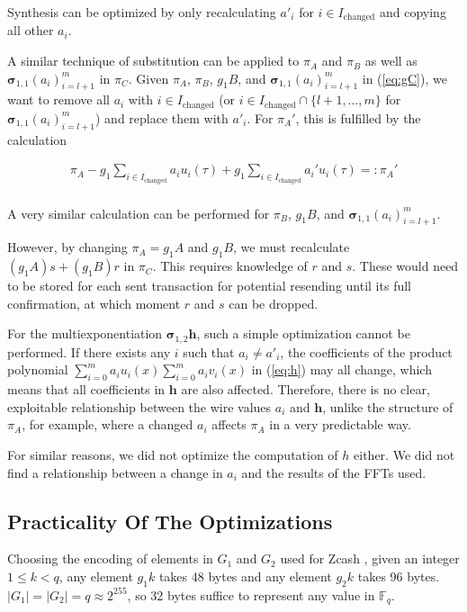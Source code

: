 \documentclass{article}
\begin{document}
Synthesis can be optimized by only recalculating $a'_i$ for $i \in I_\text{changed}$ and copying all other $a_i$.

A similar technique of substitution can be applied to $\pi_A$ and $\pi_B$ as well as $\boldsymbol\sigma_{1,1}(a_i)_{i=l+1}^m$ in $\pi_C$.
Given $\pi_A$, $\pi_B$, $g_1B$, and $\boldsymbol\sigma_{1,1}(a_i)_{i=l+1}^m$ in (\ref{eq:gC}), we want to remove all $a_i$ with $i \in I_\text{changed}$ (or $i \in I_\text{changed} \cap \{l+1,\ldots,m\}$ for $\boldsymbol\sigma_{1,1}(a_i)_{i=l+1}^m$) and replace them with $a'_i$.
For $\pi_A'$, this is fulfilled by the calculation

\begin{align*}
        \pi_A - g_1{\sum_{i \in I_\text{changed}}a_iu_i(\tau)} + g_1{\sum_{i \in I_\text{changed}}a_i'u_i(\tau)} =: \pi_A' \\
\end{align*}

A very similar calculation can be performed for $\pi_B$, $g_1B$, and $\boldsymbol\sigma_{1,1}(a_i)_{i=l+1}^m$.

However, by changing $\pi_A = g_1A$ and $g_1B$, we must recalculate ${(g_1A)}s + {(g_1B)}r$ in $\pi_C$.
This requires knowledge of $r$ and $s$.
These would need to be stored for each sent transaction for potential resending until its full confirmation, at which moment $r$ and $s$ can be dropped.

For the multiexponentiation $\boldsymbol\sigma_{1,2}\boldsymbol{h}$, such a simple optimization cannot be performed.
If there exists any $i$ such that $a_i \neq a'_i$, the coefficients of the product polynomial $\sum_{i=0}^ma_iu_i(x)\sum_{i=0}^ma_iv_i(x)$ in (\ref{eq:h}) may all change, which means that all coefficients in $\boldsymbol{h}$ are also affected.
Therefore, there is no clear, exploitable relationship between the wire values $a_i$ and $\boldsymbol{h}$, unlike the structure of $\pi_A$, for example, where a changed $a_i$ affects $\pi_A$ in a very predictable way.

For similar reasons, we did not optimize the computation of $h$ either.
We did not find a relationship between a change in $a_i$ and the results of the FFTs used.

\subsection{Practicality Of The Optimizations} \label{sec:benchmarks}

Choosing the encoding of elements in $G_1$ and $G_2$ used for Zcash \cite{hopwood:zcash}, given an integer $1 \leq k < q$, any element $g_1k$ takes 48 bytes and any element $g_2k$ takes 96 bytes.
$|G_1| = |G_2| = q \approx 2^{255}$, so 32 bytes suffice to represent any value in $\mathbb{F}_q$.
\end{document}
